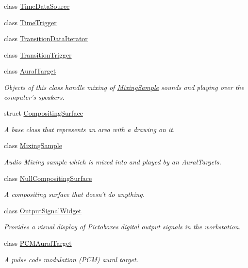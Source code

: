 \begin{DoxyCompactItemize}
\item 
class \hyperlink{class_picto_1_1_time_data_source}{Time\-Data\-Source}
\item 
class \hyperlink{class_picto_1_1_time_trigger}{Time\-Trigger}
\item 
class \hyperlink{class_picto_1_1_transition_data_iterator}{Transition\-Data\-Iterator}
\item 
class \hyperlink{class_picto_1_1_transition_trigger}{Transition\-Trigger}
\item 
class \hyperlink{class_picto_1_1_aural_target}{Aural\-Target}
\begin{DoxyCompactList}\small\item\em Objects of this class handle mixing of \hyperlink{class_picto_1_1_mixing_sample}{Mixing\-Sample} sounds and playing over the computer's speakers. \end{DoxyCompactList}\item 
struct \hyperlink{struct_picto_1_1_compositing_surface}{Compositing\-Surface}
\begin{DoxyCompactList}\small\item\em A base class that represents an area with a drawing on it. \end{DoxyCompactList}\item 
class \hyperlink{class_picto_1_1_mixing_sample}{Mixing\-Sample}
\begin{DoxyCompactList}\small\item\em Audio Mixing sample which is mixed into and played by an Aural\-Targets. \end{DoxyCompactList}\item 
class \hyperlink{class_picto_1_1_null_compositing_surface}{Null\-Compositing\-Surface}
\begin{DoxyCompactList}\small\item\em A compositing surface that doesn't do anything. \end{DoxyCompactList}\item 
class \hyperlink{class_picto_1_1_output_signal_widget}{Output\-Signal\-Widget}
\begin{DoxyCompactList}\small\item\em Provides a visual display of Pictoboxes digital output signals in the workstation. \end{DoxyCompactList}\item 
class \hyperlink{class_picto_1_1_p_c_m_aural_target}{P\-C\-M\-Aural\-Target}
\begin{DoxyCompactList}\small\item\em A pulse code modulation (P\-C\-M) aural target. \end{DoxyCompactList}\item 

\end{DoxyCompactItemize}
